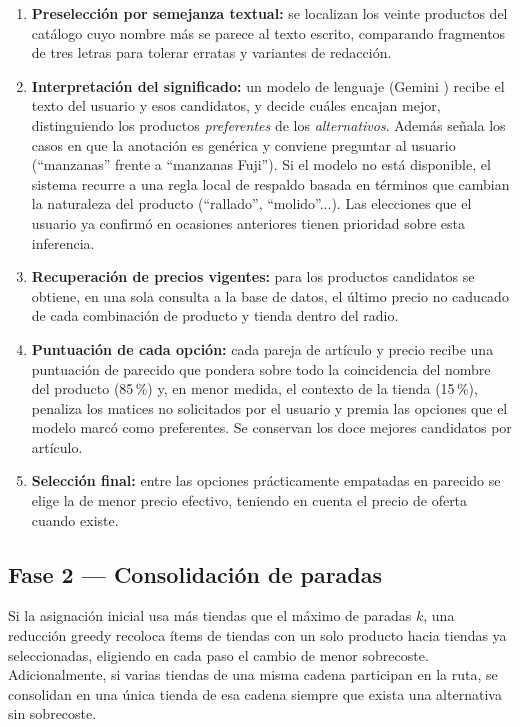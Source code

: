 \begin{enumerate}
  \item \textbf{Preselecci\'on por semejanza textual:} se localizan los veinte productos del
    cat\'alogo cuyo nombre m\'as se parece al texto escrito, comparando fragmentos de tres letras
    para tolerar erratas y variantes de redacci\'on.
  \item \textbf{Interpretaci\'on del significado:} un modelo de lenguaje (Gemini \cite{gemini_docs})
    recibe el texto del usuario y esos candidatos, y decide cu\'ales encajan mejor, distinguiendo
    los productos \emph{preferentes} de los \emph{alternativos}. Adem\'as se\~nala los casos en que
    la anotaci\'on es gen\'erica y conviene preguntar al usuario (``manzanas'' frente a ``manzanas
    Fuji''). Si el modelo no est\'a disponible, el sistema recurre a una regla local de respaldo
    basada en t\'erminos que cambian la naturaleza del producto (``rallado'', ``molido''...). Las
    elecciones que el usuario ya confirm\'o en ocasiones anteriores tienen prioridad sobre esta
    inferencia.
  \item \textbf{Recuperaci\'on de precios vigentes:} para los productos candidatos se obtiene, en
    una sola consulta a la base de datos, el \'ultimo precio no caducado de cada combinaci\'on de
    producto y tienda dentro del radio.
  \item \textbf{Puntuaci\'on de cada opci\'on:} cada pareja de art\'iculo y precio recibe una
    puntuaci\'on de parecido que pondera sobre todo la coincidencia del nombre del producto
    (85\,\%) y, en menor medida, el contexto de la tienda (15\,\%), penaliza los matices no
    solicitados por el usuario y premia las opciones que el modelo marc\'o como preferentes. Se
    conservan los doce mejores candidatos por art\'iculo.
  \item \textbf{Selecci\'on final:} entre las opciones pr\'acticamente empatadas en parecido se
    elige la de menor precio efectivo, teniendo en cuenta el precio de oferta cuando existe.
\end{enumerate}

\subsection{Fase 2 --- Consolidaci\'on de paradas}\label{subsec:consolidacion}

Si la asignaci\'on inicial usa m\'as tiendas que el m\'aximo de paradas $k$, una reducci\'on
greedy recoloca \'items de tiendas con un solo producto hacia tiendas ya seleccionadas,
eligiendo en cada paso el cambio de menor sobrecoste. Adicionalmente, si varias tiendas de una
misma cadena participan en la ruta, se consolidan en una \'unica tienda de esa cadena siempre
que exista una alternativa sin sobrecoste.

